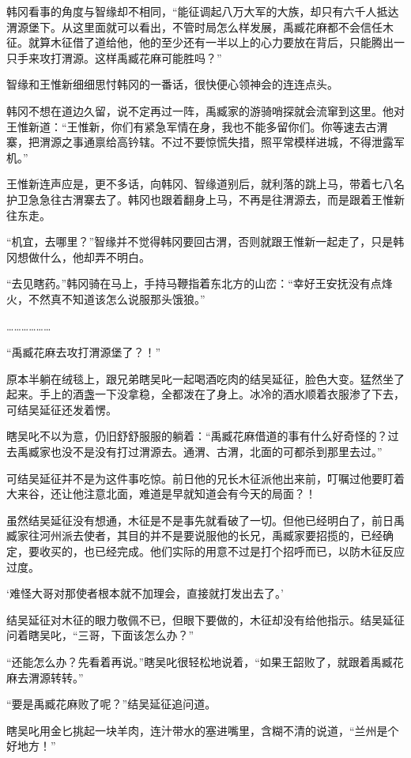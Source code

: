 韩冈看事的角度与智缘却不相同，“能征调起八万大军的大族，却只有六千人抵达渭源堡下。从这里面就可以看出，不管时局怎么样发展，禹臧花麻都不会信任木征。就算木征借了道给他，他的至少还有一半以上的心力要放在背后，只能腾出一只手来攻打渭源。这样禹臧花麻可能胜吗？”

智缘和王惟新细细思忖韩冈的一番话，很快便心领神会的连连点头。

韩冈不想在道边久留，说不定再过一阵，禹臧家的游骑哨探就会流窜到这里。他对王惟新道：“王惟新，你们有紧急军情在身，我也不能多留你们。你等速去古渭寨，把渭源之事通禀给高钤辖。不过不要惊慌失措，照平常模样进城，不得泄露军机。”

王惟新连声应是，更不多话，向韩冈、智缘道别后，就利落的跳上马，带着七八名护卫急急往古渭寨去了。韩冈也跟着翻身上马，不再是往渭源去，而是跟着王惟新往东走。

“机宜，去哪里？”智缘并不觉得韩冈要回古渭，否则就跟王惟新一起走了，只是韩冈想做什么，他却弄不明白。

“去见瞎药。”韩冈骑在马上，手持马鞭指着东北方的山峦：“幸好王安抚没有点烽火，不然真不知道该怎么说服那头饿狼。”

………………

“禹臧花麻去攻打渭源堡了？！”

原本半躺在绒毯上，跟兄弟瞎吴叱一起喝酒吃肉的结吴延征，脸色大变。猛然坐了起来。手上的酒盏一下没拿稳，全都泼在了身上。冰冷的酒水顺着衣服渗了下去，可结吴延征还发着愣。

瞎吴叱不以为意，仍旧舒舒服服的躺着：“禹臧花麻借道的事有什么好奇怪的？过去禹臧家也没不是没有打过渭源去。通渭、古渭，北面的可都杀到那里去过。”

可结吴延征并不是为这件事吃惊。前日他的兄长木征派他出来前，叮嘱过他要盯着大来谷，还让他注意北面，难道是早就知道会有今天的局面？！

虽然结吴延征没有想通，木征是不是事先就看破了一切。但他已经明白了，前日禹臧家往河州派去使者，其目的并不是要说服他的长兄，禹臧家要招揽的，已经确定，要收买的，也已经完成。他们实际的用意不过是打个招呼而已，以防木征反应过度。

‘难怪大哥对那使者根本就不加理会，直接就打发出去了。’

结吴延征对木征的眼力敬佩不已，但眼下要做的，木征却没有给他指示。结吴延征问着瞎吴叱，“三哥，下面该怎么办？”

“还能怎么办？先看着再说。”瞎吴叱很轻松地说着，“如果王韶败了，就跟着禹臧花麻去渭源转转。”

“要是禹臧花麻败了呢？”结吴延征追问道。

瞎吴叱用金匕挑起一块羊肉，连汁带水的塞进嘴里，含糊不清的说道，“兰州是个好地方！”

